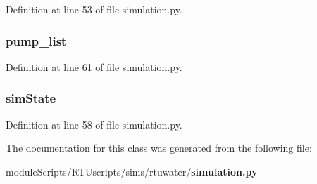 Definition at line 53 of file simulation.\+py.

\subsubsection[{pump\+\_\+list}]{\setlength{\rightskip}{0pt plus 5cm}pump\+\_\+list}\label{classsims_1_1rtuwater_1_1simulation_1_1_simulation_aea375cf588bb6fd06df93af152cdc0d5}


Definition at line 61 of file simulation.\+py.

\subsubsection[{sim\+State}]{\setlength{\rightskip}{0pt plus 5cm}sim\+State}\label{classsims_1_1rtuwater_1_1simulation_1_1_simulation_a41f89dc1173ec57bbed0975711b48c36}


Definition at line 58 of file simulation.\+py.



The documentation for this class was generated from the following file\+:\begin{DoxyCompactItemize}
\item 
module\+Scripts/\+R\+T\+Uscripts/sims/rtuwater/{\bf simulation.\+py}\end{DoxyCompactItemize}
